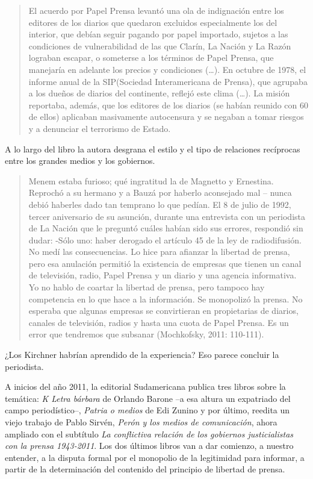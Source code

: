 {\begin{quote}
El acuerdo por Papel Prensa levantó una ola de indignación entre los editores de los diarios que quedaron excluidos especialmente los del interior, que debían seguir pagando por papel importado, sujetos a las condiciones de vulnerabilidad de las que Clarín, La Nación y La Razón lograban escapar, o someterse a los términos de Papel Prensa, que manejaría en adelante los precios y condiciones (\ldots). En octubre de 1978, el informe anual de la SIP(Sociedad Interamericana de Prensa), que agrupaba a los dueños de diarios del continente, reflejó este clima (\ldots). La misión reportaba, además, que los editores de los diarios (se habían reunido con 60 de ellos) aplicaban masivamente autocensura y se negaban a tomar riesgos y a denunciar el terrorismo de Estado.
\end{quote}

A lo largo del libro la autora desgrana el estilo y el tipo de relaciones recíprocas entre los grandes medios y los gobiernos.

\begin{quote}
Menem estaba furioso; qué ingratitud la de Magnetto y Ernestina. Reprochó a su hermano y a Bauzá por haberlo aconsejado mal -- nunca debió haberles dado tan temprano lo que pedían. El 8 de julio de 1992, tercer aniversario de su asunción, durante una entrevista con un periodista de La Nación que le preguntó cuáles habían sido sus errores, respondió sin dudar: -Sólo uno: haber derogado el artículo 45 de la ley de radiodifusión. No medí las consecuencias. Lo hice para afianzar la libertad de prensa, pero esa anulación permitió la existencia de empresas que tienen un canal de televisión, radio, Papel Prensa y un diario y una agencia informativa. Yo no hablo de coartar la libertad de prensa, pero tampoco hay competencia en lo que hace a la información. Se monopolizó la prensa. No esperaba que algunas empresas se convirtieran en propietarias de diarios, canales de televisión, radios y hasta una cuota de Papel Prensa. Es un error que tendremos que subsanar (Mochkofsky, 2011: 110-111).
\end{quote}

¿Los Kirchner habrían aprendido de la experiencia? Eso parece concluir la periodista.

A inicios del año 2011, la editorial Sudamericana publica tres libros sobre la temática: \emph{K Letra bárbara} de Orlando Barone --a esa altura un expatriado del campo periodístico--, \emph{Patria o medios} de Edi Zunino y por último, reedita un viejo trabajo de Pablo Sirvén, \emph{Perón y los medios de comunicación}, ahora ampliado con el subtítulo \emph{La conflictiva relación de los gobiernos justicialistas con la prensa 1943-2011}. Los dos últimos libros van a dar comienzo, a nuestro entender, a la disputa formal por el monopolio de la legitimidad para informar, a partir de la determinación del contenido del principio de libertad de prensa.

}
